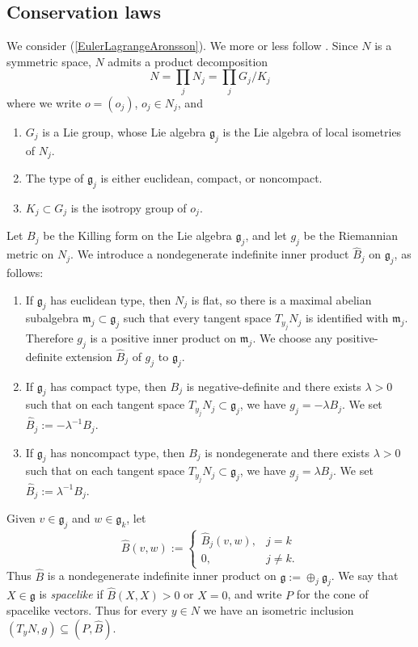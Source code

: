 \documentclass[reqno,11pt]{amsart}
\newcommand{\frkg}{\mathfrak g}
\newcommand{\dfn}[1]{\emph{#1}\index{#1}}
\theoremstyle{definition}
\numberwithin{equation}{section}
\begin{document}
\subsection{Conservation laws}
We consider (\ref{EulerLagrangeAronsson}).
We more or less follow \cite[\S3.5]{daskalopoulos2022analytic}.
Since $N$ is a symmetric space, $N$ admits a product decomposition
$$N = \prod_j N_j = \prod_j G_j / K_j$$
where we write $o = (o_j)$, $o_j \in N_j$, and
\begin{enumerate}
\item $G_j$ is a Lie group, whose Lie algebra $\frkg_j$ is the Lie algebra of local isometries of $N_j$.
\item The type of $\frkg_j$ is either euclidean, compact, or noncompact.
\item $K_j \subset G_j$ is the isotropy group of $o_j$.
\end{enumerate}
Let $B_j$ be the Killing form on the Lie algebra $\frkg_j$, and let $g_j$ be the Riemannian metric on $N_j$.
We introduce a nondegenerate indefinite inner product $\hat B_j$ on $\frkg_j$, as follows:
\begin{enumerate}
\item If $\frkg_j$ has euclidean type, then $N_j$ is flat, so there is a maximal abelian subalgebra $\mathfrak m_j \subset \frkg_j$ such that every tangent space $T_{y_j} N_j$ is identified with $\mathfrak m_j$. Therefore $g_j$ is a positive inner product on $\mathfrak m_j$. We choose any positive-definite extension $\hat B_j$ of $g_j$ to $\frkg_j$.
\item If $\frkg_j$ has compact type, then $B_j$ is negative-definite and there exists $\lambda > 0$ such that on each tangent space $T_{y_j} N_j \subset \frkg_j$, we have $g_j = -\lambda B_j$. We set $\hat B_j := -\lambda^{-1} B_j$.
\item If $\frkg_j$ has noncompact type, then $B_j$ is nondegenerate and there exists $\lambda > 0$ such that on each tangent space $T_{y_j} N_j \subset \frkg_j$, we have $g_j = \lambda B_j$. We set $\hat B_j := \lambda^{-1} B_j$.
\end{enumerate}
Given $v \in \frkg_j$ and $w \in \frkg_k$, let
$$\hat B(v, w) := \begin{cases}
\hat B_j(v, w),& j = k \\
0,& j \neq k.
\end{cases}$$
Thus $\hat B$ is a nondegenerate indefinite inner product on $\frkg := \oplus_j \frkg_j$.
We say that $X \in \frkg$ is \dfn{spacelike} if $\hat B(X, X) > 0$ or $X = 0$, and write $P$ for the cone of spacelike vectors.
Thus for every $y \in N$ we have an isometric inclusion $(T_y N, g) \subseteq (P, \hat B)$.
\end{document}
